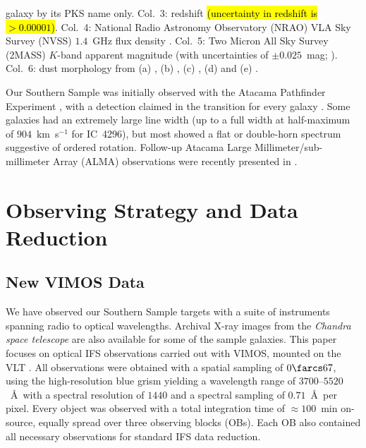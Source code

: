 \documentclass[a4paper,fleqn,usenatbib]{mnras}
\DeclareRobustCommand{\added}[1]{{\sethlcolor{green}\hl{#1}}}
\begin{document}
\begin{table}[t]
\begin{center}
{      galaxy by its PKS name only. Col.~3: redshift \added{(uncertainty in redshift is $> 0.00001$)}. Col.~4: National
      Radio Astronomy Observatory (NRAO) VLA Sky Survey (NVSS)
      $1.4$~GHz flux density \citep{Condon1998}. Col.~5: Two Micron
      All Sky Survey (2MASS) $K$-band apparent magnitude (with
      uncertainties of $\pm0.025$~mag;
      \citealt{Skrutskie2006}). Col.~6: dust morphology from (a)
      \citet{Govoni2000}, (b) \citet{Lauer2005}, (c)
      \citet{Bettoni2001}, (d) \citet{Sandage1979} and (e)
      \citet{Colbert2001}.}
  \end{center}
\end{table}

Our Southern Sample was initially observed with the Atacama Pathfinder
Experiment \citep[APEX; ][]{Gusten2006}, with a detection claimed in
the  transition for every galaxy
\citep{Prandoni2012}. Some galaxies had an extremely large line width
(up to a full width at half-maximum of $904$~km~s$^{-1}$ for IC~4296),
but most showed a flat or double-horn spectrum suggestive of ordered
rotation. Follow-up Atacama Large Millimeter/sub-millimeter Array
(ALMA) observations were recently presented in \citet{ruffa2019,
  ruffa2020}.

\section{Observing Strategy and Data Reduction}
\label{sec:obs}

\subsection{New VIMOS Data}
\label{subsec:VIMOS}

We have observed our Southern Sample targets with a suite of
instruments spanning radio to optical wavelengths. Archival X-ray
images from the \textit{Chandra space telescope} are also available
for some of the sample galaxies. This paper focuses on optical IFS
observations carried out with VIMOS, mounted on the VLT
\citep{LeFevre2003}. All observations were obtained with a spatial
sampling of $0\farcs67$, using the high-resolution blue grism yielding
a wavelength range of $3700$--$5520$~\AA\ with a spectral resolution
of $1440$ and a spectral sampling of $0.71$~\AA\ per pixel. Every
object was observed with a total integration time of $\approx100$~min
on-source, equally spread over three observing blocks (OBs). Each OB
also contained all necessary observations for standard IFS data
reduction.
\end{document}

